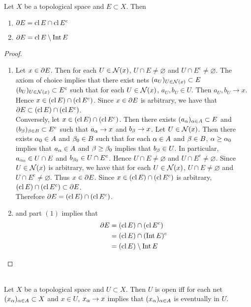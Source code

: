 \documentclass{book}
\begin{document}
	\begin{ex}
		Let $X$ be a topological space and $E \subset X$. Then 
		\begin{enumerate}
			\item $\partial E = \operatorname{cl} E \cap \operatorname{cl} E^c$ 
			\item $\partial E = \operatorname{cl} E \setminus \operatorname{Int} E$
		\end{enumerate}
	\end{ex}
	
	\begin{proof}\
		\begin{enumerate}
			\item Let $x \in \partial E$. Then for each $U \in \mathcal{N}(x)$, $U \cap E \neq \varnothing$ and $U \cap E^c \neq \varnothing$. The axiom of choice implies that there exist nets $(a_U)_{U \in \mathcal{N}(x)} \subset E$ $(b_U)_{U \in \mathcal{N}(x)} \subset E^c$ such that for each $U \in \mathcal{N}(x)$, $a_U, b_U \in U$. Then $a_U, b_U \rightarrow x$. Hence $x \in (\operatorname{cl} E) \cap (\operatorname{cl} E^c)$. Since $x \in \partial E$ is arbitrary, we have that $\partial E \subset (\operatorname{cl} E) \cap (\operatorname{cl} E^c)$. \\
			Conversely, let $x \in (\operatorname{cl} E) \cap (\operatorname{cl} E^c)$. Then there exists $(a_{\alpha})_{\alpha \in A} \subset E$ and $(b_{\beta})_{\beta \in B} \subset E^c$ such that $a_{\alpha} \rightarrow x$ and $b_{\beta} \rightarrow x$. Let $U \in \mathcal{N}(x)$. Then there exists $\alpha_0 \in A$ and $\beta_0 \in B$ such that for each $\alpha \in A$ and $\beta \in B$, $\alpha \geq \alpha_0$ implies that $a_{\alpha} \in A$ and $\beta \geq \beta_0$ implies that $b_{\beta} \in U$. In particular, $a_{\alpha_0} \in U \cap E$ and $b_{\beta_0} \in U \cap E^c$. Hence $U \cap E \neq \varnothing$ and $U \cap E^c \neq \varnothing$. Since $U \in \mathcal{N}(x)$ is arbitrary, we have that for each $U \in \mathcal{N}(x)$, $U \cap E \neq \varnothing$ and $U \cap E^c \neq \varnothing$. Thus $x \in \partial E$. Since $x \in (\operatorname{cl} E) \cap (\operatorname{cl} E^c)$ is arbitrary, $(\operatorname{cl} E) \cap (\operatorname{cl} E^c) \subset \partial E$. \\
			Therefore $\partial E = (\operatorname{cl} E) \cap (\operatorname{cl} E^c)$.
			\item {} and part $(1)$ implies that 
			\begin{align*}
				\partial E
				& = (\operatorname{cl} E) \cap (\operatorname{cl} E^c) \\
				& = (\operatorname{cl} E) \cap (\operatorname{Int} E)^c \\
				& = (\operatorname{cl} E) \setminus \operatorname{Int} E
			\end{align*}
		\end{enumerate}
	\end{proof}
	

	\begin{ex}  \\
		Let $X$ be a topological space and $U \subset X$. Then $U$ is open iff for each net $(x_{\alpha})_{\alpha \in A} \subset X$ and $x \in U$, $x_{\alpha} \rightarrow x$ implies that $(x_{\alpha})_{\alpha \in A} $ is eventually in $U$.
	\end{ex}
\end{document}
